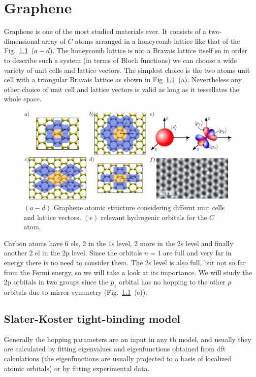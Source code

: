 \chapter{Graphene}
\label{ch:graphene}
Graphene is one of the most studied materials ever. It consists of a two-dimensional array of $C$ atoms arranged in a honeycomb lattice like that of the Fig.~\ref{graphene_structure}~($a-d$). The honeycomb lattice is not a Bravais lattice itself so in order to describe such a system (in terms of Bloch functions) we can choose a wide variety of unit cells and lattice vectors. The simplest choice is the two atoms unit cell with a triangular Bravais lattice as shown in Fig~\ref{graphene_structure}~(a). Nevertheless any other choice of unit cell and lattice vectors is valid as long as it tessellates the whole space.
\begin{figure}[h!]
\centering
\includegraphics[width=\textwidth]{chapter04/figures/graphene.pdf}
\vspace{-5pt}
\caption{$(a-d)$ Graphene atomic structure considering differnt unit cells and lattice vectors. $(e)$ relevant hydrogenic orbitals for the $C$ atom.}
\label{graphene_structure}
\end{figure}
\FloatBarrier
Carbon atoms have 6 \acp{el}, 2 in the 1s level, 2 more in the 2s level and finally another 2 \ac{el} in the 2p level. Since the orbitals $n=1$ are full and very far in energy there is no need to consider them.
The 2s level is also full, but not so far from the Fermi energy, so we will take a look at its importance.
We will study the 2p orbitals in two groups since the $p_z$ orbital has no hopping to the other $p$ orbitals due to mirror symmetry (Fig.~\ref{graphene_structure}~(e)).



\section{Slater-Koster tight-binding model}
\label{sec:SK}
Generally the hopping parameters are an input in any \ac{tb} model, and usually they are calculated by fitting eigenvalues and eigenfunctions obtained from \ac{dft} calculations (the eigenfunctions are usually projected to a basis of localized atomic orbitals) or by fitting experimental data.

